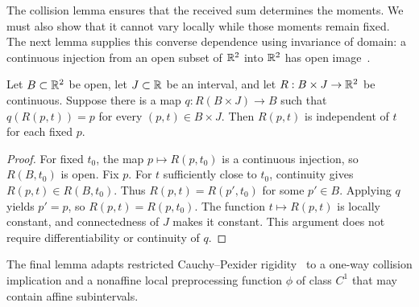 The collision lemma ensures that the received sum determines the moments. We must also show that it cannot vary locally while those moments remain fixed. The next lemma supplies this converse dependence using invariance of domain: a continuous injection from an open subset of $\mathbb R^2$ into $\mathbb R^2$ has open image~\cite[Theorem 2B.3]{hatcher}.

\begin{lemma}
\label{lem:topology}
Let $B\subset\mathbb R^2$ be open, let $J\subset\mathbb R$ be an interval, and let $R:B\times J\to\mathbb R^2$ be continuous. Suppose there is a map $q:R(B\times J)\to B$ such that $q(R(p,t))=p$ for every $(p,t)\in B\times J$. Then $R(p,t)$ is independent of $t$ for each fixed $p$.
\end{lemma}
\begin{proof}
For fixed $t_0$, the map $p\mapsto R(p,t_0)$ is a continuous injection, so $R(B,t_0)$ is open. Fix $p$. For $t$ sufficiently close to $t_0$, continuity gives $R(p,t)\in R(B,t_0)$. Thus $R(p,t)=R(p',t_0)$ for some $p'\in B$. Applying $q$ yields $p'=p$, so $R(p,t)=R(p,t_0)$. The function $t\mapsto R(p,t)$ is locally constant, and connectedness of $J$ makes it constant. This argument does not require differentiability or continuity of $q$.
\end{proof}

The final lemma adapts restricted Cauchy--Pexider rigidity~\cite[Theorem 1.6 and Sec. 5]{charalambides2013} to a one-way collision implication and a nonaffine local preprocessing function $\phi$ of class $C^1$ that may contain affine subintervals.


